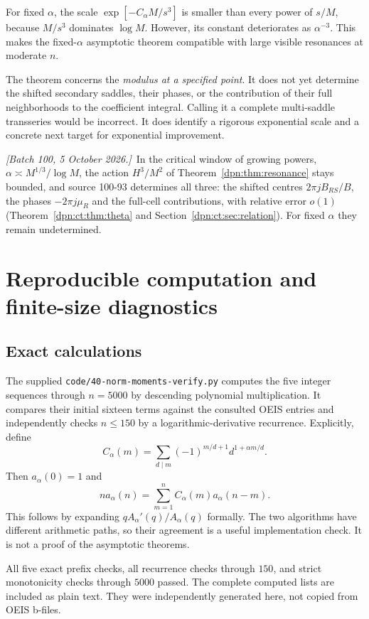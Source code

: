\documentclass[11pt]{article}
\numberwithin{equation}{section}
\theoremstyle{definition}\newtheorem{definition}[theorem]{Definition}
\theoremstyle{remark}\newtheorem{remark}[theorem]{Remark}
\newcommand{\file}[1]{\nolinkurl{#1}}
\newcommand{\writenoted}[1]{\par\smallskip\noindent\textit{[Batch 100, 5 October 2026.]}\ #1\par\smallskip}
\begin{document}
For fixed $\alpha$, the scale $\exp[-C_\alpha M/s^3]$ is smaller than
every power of $s/M$, because $M/s^3$ dominates $\log M$. However, its
constant deteriorates as $\alpha^{-3}$. This makes the fixed-$\alpha$
asymptotic theorem compatible with large visible resonances at moderate $n$.

The theorem concerns the \emph{modulus at a specified point}. It does not
yet determine the shifted secondary saddles, their phases, or the contribution
of their full neighborhoods to the coefficient integral. Calling it a
complete multi-saddle transseries would be incorrect. It does identify a
rigorous exponential scale and a concrete next target for exponential
improvement.
\writenoted{In the critical window of growing powers,
$\alpha\asymp M^{1/3}/\log M$, the action $H^3/M^2$ of
Theorem~\ref{dpn:thm:resonance} stays bounded, and source 100-93 determines all
three: the shifted centres $2\pi jB_{RS}/B$, the phases $-2\pi j\mu_R$ and the
full-cell contributions, with relative error $o(1)$
(Theorem~\ref{dpn:ct:thm:theta} and Section~\ref{dpn:ct:sec:relation}).  For
fixed $\alpha$ they remain undetermined.}

\section{Reproducible computation and finite-size diagnostics}\label{dpn:sec:checks}
\subsection{Exact calculations}
The supplied \file{code/40-norm-moments-verify.py} computes the five integer sequences through
$n=5000$ by descending polynomial multiplication. It compares their initial
sixteen terms against the consulted OEIS entries and independently checks
$n\le150$ by a logarithmic-derivative recurrence. Explicitly, define
\begin{equation}\label{dpn:eq:exactB}
 C_\alpha(m)=\sum_{d\mid m}(-1)^{m/d+1}d^{1+\alpha m/d}.
\end{equation}
Then $a_\alpha(0)=1$ and
\begin{equation}\label{dpn:eq:exactrec}
 n a_\alpha(n)=\sum_{m=1}^n C_\alpha(m)a_\alpha(n-m).
\end{equation}
This follows by expanding $qA_\alpha'(q)/A_\alpha(q)$ formally. The two
algorithms have different arithmetic paths, so their agreement is a useful
implementation check. It is not a proof of the asymptotic theorems.

All five exact prefix checks, all recurrence checks through $150$, and strict
monotonicity checks through $5000$ passed. The complete computed lists are
included as plain text. They were independently generated here, not copied
from OEIS b-files.
\end{document}
